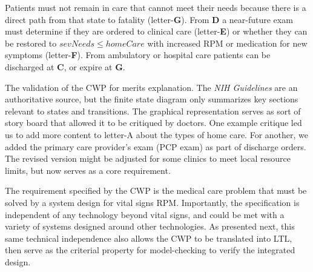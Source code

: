 Patients must not remain in care that cannot meet their needs because there is a direct path from that state to fatality (letter-\textbf{G}).
From \textbf{D} a near-future exam must determine if they are ordered to clinical care (letter-\textbf{E}) or whether they can be restored to \emph{$sevNeeds\le homeCare$} with increased RPM or medication for new symptoms (letter-\textbf{F}).
From ambulatory or hospital care patients can be discharged at \textbf{C}, or expire at \textbf{G}.

The validation of the CWP for \phware merits explanation.
The \emph{NIH Guidelines} are an authoritative source, but the finite state diagram only summarizes key sections relevant to states and transitions. 
The graphical representation serves as sort of story board that allowed it to be critiqued by doctors. 
One example critique led us to add more content to letter-A about the types of home care.  
For another, we added the primary care provider's exam (PCP exam) as part of discharge orders. The revised version might be adjusted for some clinics to meet local resource limits, but now serves as a core requirement. 

The requirement specified by the CWP is the medical care problem that must be solved by a system design for vital signs RPM.
Importantly, the specification is independent of any technology beyond vital signs, and could be met with a variety of systems designed around other technologies.  
As presented next, this same technical independence also allows the CWP to be translated into LTL, then serve as the criterial property for model-checking to verify the integrated design.
